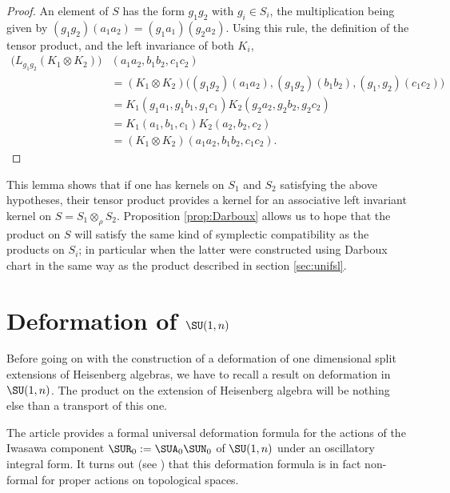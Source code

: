 \begin{proof}
An element of $S$ has the form $g_1g_2$ with $g_i\in S_i$, the multiplication being given by $(g_1g_2)(a_1a_2)=(g_1a_1)(g_2a_2)$. Using this rule, the definition of the tensor product, and the left invariance of both $K_i$,
\[ 
\begin{split}
\big( L_{g_1g_2}(K_1\otimes K_2) \big)&(a_1a_2,b_1b_2,c_1c_2)\\
            &=(K_1\otimes K_2)\big( (g_1g_2)(a_1a_2),(g_1g_2)(b_1b_2),(g_1,g_2)(c_1c_2) \big)\\
            &=K_1(g_1a_1,g_1b_1,g_1c_1)K_2(g_2a_2,g_2b_2,g_2c_2)\\
            &=K_1(a_1,b_1,c_1)K_2(a_2,b_2,c_2)\\
            &=(K_1\otimes K_2)(a_1a_2,b_1b_2,c_1c_2).
\end{split}  
\]

\end{proof}

This lemma shows that if one has kernels on $S_1$ and $S_2$ satisfying the above hypotheses, their tensor product provides a kernel for an associative left invariant kernel on $S=S_1\otimes_{\rho} S_2$.  Proposition \ref{prop:Darboux} allows us to hope that the product on $S$ will satisfy the same kind of symplectic compatibility as the products on $S_i$; in particular when the latter were constructed using Darboux chart in the same way as the product described in section  \ref{sec:unifsl}.


\section{Deformation of \texorpdfstring{$\SU(1,n)$}{SU1n}}   \label{SecDefSURme}

Before going on with the construction of a deformation of one dimensional split extensions of Heisenberg algebras, we have to recall a result on deformation in $\SU(1,n)$. The product on the extension of Heisenberg algebra will be nothing else than a transport of this one.

The article \cite{Biel-Massar} provides a formal universal deformation formula for the actions of the Iwasawa component $\SUR_0:=\SUA_0\SUN_0$ of $\SU(1,n)$ under an oscillatory integral form.  It turns out (see \cite{lcBBM}) that this deformation formula is in fact non-formal for proper actions on topological spaces. 

